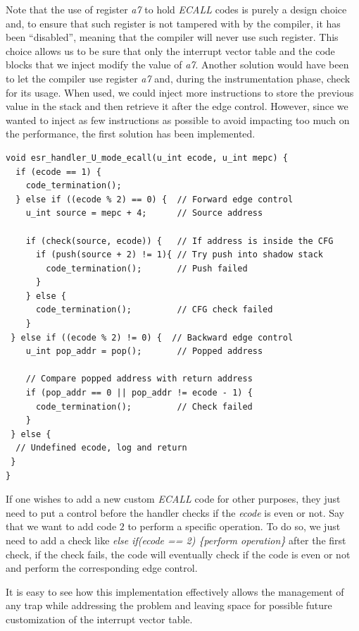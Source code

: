Note that the use of register \textit{a7} to hold \textit{ECALL} codes is purely
a design choice and, to ensure that such register is not tampered with by the
compiler, it has been ``disabled'', meaning that the compiler will never use
such register. This choice allows us to be sure that only the interrupt vector table
and the code blocks that we inject modify the value of \textit{a7}. Another solution
would have been to let the compiler use register \textit{a7} and, during the instrumentation
phase, check for its usage. When used, we could inject more instructions to
store the previous value in the stack and then retrieve it after the edge
control. However, since we wanted to inject as few instructions as possible to
avoid impacting too much on the performance, the first solution has been implemented.
\\
\begin{lstlisting}[style=CStyle, caption = U-mode \textit{ECALL} handler, label={lst:ecallhandler}]
void esr_handler_U_mode_ecall(u_int ecode, u_int mepc) {
  if (ecode == 1) {
    code_termination();
  } else if ((ecode % 2) == 0) {  // Forward edge control
    u_int source = mepc + 4;      // Source address

    if (check(source, ecode)) {   // If address is inside the CFG
      if (push(source + 2) != 1){ // Try push into shadow stack
        code_termination();       // Push failed
      }
    } else {
      code_termination();         // CFG check failed
    }
 } else if ((ecode % 2) != 0) {  // Backward edge control
    u_int pop_addr = pop();       // Popped address

    // Compare popped address with return address
    if (pop_addr == 0 || pop_addr != ecode - 1) {
      code_termination();         // Check failed
    }
 } else {
  // Undefined ecode, log and return
 }
}
\end{lstlisting}

If one wishes to add a new custom \textit{ECALL} code for other purposes, they just
need to put a control before the handler checks if the \textit{ecode} is even or
not. Say that we want to add code $2$ to perform a specific operation. To do so,
we just need to add a check like \textit{else if(ecode == 2) \{perform operation\}}
after the first check, if the check fails, the code will eventually check if the
code is even or not and perform the corresponding edge control.

It is easy to see how this implementation effectively allows the management of
any trap while addressing the problem and leaving space for possible future
customization of the interrupt vector table.

